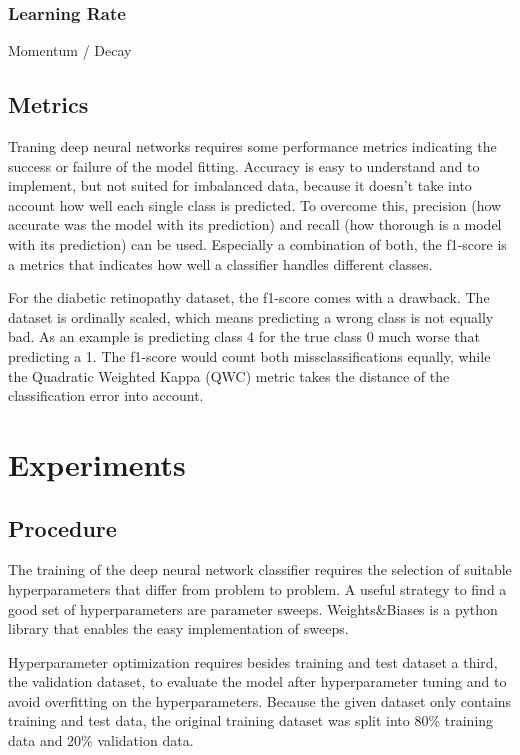 \documentclass{article}
\begin{document}
\subsubsection{Learning Rate}
Momentum / Decay

\subsection{Metrics}
Traning deep neural networks requires some performance metrics indicating the success or failure of the model fitting. Accuracy
is easy to understand and to implement, but not suited for imbalanced data, because it doesn't take into account how well each 
single class is predicted. 
To overcome this, precision (how accurate was the model with its prediction) and recall (how thorough is a model with its prediction) can be used. 
Especially a combination of both, the f1-score is a metrics that indicates how well a classifier handles different classes.

For the diabetic retinopathy dataset, the f1-score comes with a drawback. The dataset is ordinally scaled, which means predicting 
a wrong class is not equally bad. As an example is predicting class 4 for the true class 0 much worse that predicting a 1. The
f1-score would count both missclassifications equally, while the Quadratic Weighted Kappa (QWC) metric takes the distance of 
the classification error into account.
\section{Experiments}
\subsection{Procedure}
The training of the deep neural network classifier requires the selection of suitable hyperparameters that differ from
problem to problem. A useful strategy to find a good set of hyperparameters are parameter sweeps. Weights\&Biases is a 
python library that enables the easy implementation of sweeps. 

Hyperparameter optimization requires besides training and test dataset a third, the validation dataset, to evaluate the
model after hyperparameter tuning and to avoid overfitting on the hyperparameters. Because the given dataset only contains 
training and test data, the original training dataset was split into 80\% training data and 20\% validation data.
\end{document}
